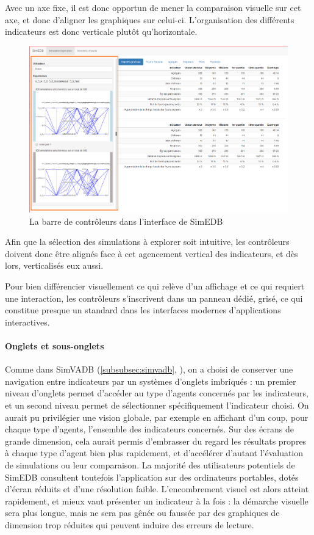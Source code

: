 Avec un axe \og fixe\fg{}, il est donc opportun de mener la comparaison visuelle sur cet axe, et donc d'aligner les graphiques sur celui-ci. L'organisation des différents indicateurs est donc verticale plutôt qu'horizontale.

\begin{figure}[H]
\centering
\includegraphics[width=\linewidth]{img/SimEDB_sidebar_cut.png}
\caption{La barre de contrôleurs dans l'interface de SimEDB}
\label{fig:simedb-sidebar}
\end{figure}

Afin que la sélection des simulations à explorer soit intuitive, les contrôleurs doivent donc être alignés face à cet agencement vertical des indicateurs, et dès lors, verticalisés eux aussi.

Pour bien différencier visuellement ce qui relève d'un affichage et ce qui requiert une interaction, les contrôleurs s'inscrivent dans un panneau dédié, grisé, ce qui constitue presque un standard dans les interfaces modernes d'applications interactives.

\paragraph*{Onglets et sous-onglets}

Comme dans SimVADB (\cref{subsubsec:simvadb}, ), on a choisi de conserver une navigation entre indicateurs par un systèmes d'onglets imbriqués : un premier niveau d'onglets permet d'accéder au type d'agents concernés par les indicateurs, et un second niveau permet de sélectionner spécifiquement l'indicateur choisi.
On aurait pu privilégier une vision globale, par exemple en affichant d'un coup, pour chaque type d'agents, l'ensemble des indicateurs concernés.
Sur des écrans de grande dimension, cela aurait permis d'embrasser du regard les résultats propres à chaque type d'agent bien plus rapidement, et d'accélérer d'autant l'évaluation de simulations ou leur comparaison.
La majorité des utilisateurs potentiels de SimEDB consultent toutefois l'application sur des ordinateurs portables, dotés d'écran réduits et d'une résolution faible.
L'encombrement visuel est alors atteint rapidement, et mieux vaut présenter un indicateur à la fois : la démarche visuelle sera plus longue, mais ne sera pas gênée ou faussée par des graphiques de dimension trop réduites qui peuvent induire des erreurs de lecture.

